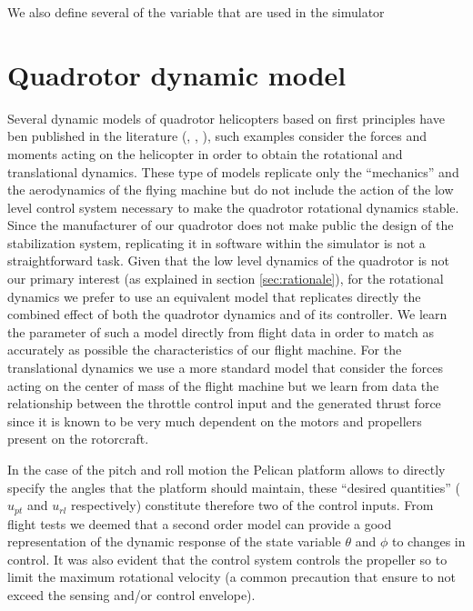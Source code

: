 \documentclass[a4paper,11pt]{report}
\begin{document}
We also define several of the variable that are used in the simulator


\section{Quadrotor dynamic model}

Several dynamic models of quadrotor helicopters based on first principles have ben published in the literature (\cite{bouabdallah07phd}, \cite{balas07modelling}, \cite{hoffmann07quadrotor}), such examples consider the forces and moments acting on the helicopter in order to obtain the rotational and translational dynamics.
These type of models replicate only the ``mechanics'' and the aerodynamics of the flying machine but do not include the action of the low level control system necessary to make the quadrotor rotational dynamics stable. Since the manufacturer of our quadrotor does not make public the design of the stabilization system, replicating it in software within the simulator is not a straightforward task. Given that the low level dynamics of the quadrotor is not our primary interest (as explained in section \ref{sec:rationale}), for the rotational dynamics we prefer to use an equivalent  model that replicates directly the combined effect of both the quadrotor dynamics and of its controller.
We learn the parameter of such a model directly from flight data in order to match as accurately as possible the characteristics of our flight machine.
For the translational dynamics we use a more standard model that consider the forces acting on the center of mass of the flight machine but we learn from data the relationship between the throttle control input and the generated thrust force since it is known to be very much dependent on the motors and propellers present on the rotorcraft.

In the case of the pitch and roll motion the Pelican platform allows to directly specify the angles that the platform should maintain, these ``desired quantities'' ($u_{pt}$ and $u_{rl}$ respectively) constitute therefore two of the control inputs. 
From flight tests we deemed that a second order model can provide a good representation of the dynamic response of the state variable $\theta$ and $\phi$ to changes in control. It was also evident that the control system controls the propeller so to limit the maximum rotational velocity (a common precaution that ensure to not exceed the sensing and/or control envelope). 
\end{document}
